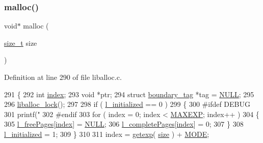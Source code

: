 \subsubsection{\texorpdfstring{malloc()}{malloc()}}
{\footnotesize\ttfamily void$\ast$ malloc (\begin{DoxyParamCaption}\item[{\hyperlink{a00038_a7c94ea6f8948649f8d181ae55911eeaf_a7c94ea6f8948649f8d181ae55911eeaf}{size\+\_\+t}}]{size }\end{DoxyParamCaption})}



Definition at line 290 of file liballoc.\+c.


\begin{DoxyCode}
291 \{
292     \textcolor{keywordtype}{int} \hyperlink{a00126_adfc426eed5361508d62c6e8f484bd270_adfc426eed5361508d62c6e8f484bd270}{index};
293     \textcolor{keywordtype}{void} *ptr;
294     \textcolor{keyword}{struct }\hyperlink{a00126}{boundary\_tag} *tag = \hyperlink{a00038_a070d2ce7b6bb7e5c05602aa8c308d0c4_a070d2ce7b6bb7e5c05602aa8c308d0c4}{NULL};
295 
296     \hyperlink{a00038_a8b5670e4594b0b6f8be78fe17f0c3b53_a8b5670e4594b0b6f8be78fe17f0c3b53}{liballoc\_lock}();
297 
298         \textcolor{keywordflow}{if} ( \hyperlink{a00035_a4aac6ed0ba0144598c5abe18222c3493_a4aac6ed0ba0144598c5abe18222c3493}{l\_initialized} == 0 )
299         \{
300 \textcolor{preprocessor}{            #ifdef DEBUG}
301             printf(\textcolor{stringliteral}{"%
302 \textcolor{preprocessor}{            #endif}
303             \textcolor{keywordflow}{for} ( index = 0; index < \hyperlink{a00035_af823bb7d083fafbd662be7ea09582013_af823bb7d083fafbd662be7ea09582013}{MAXEXP}; index++ )
304             \{
305                 \hyperlink{a00035_a78b8b6e448179d3cd64915f99fee60e0_a78b8b6e448179d3cd64915f99fee60e0}{l\_freePages}[\hyperlink{a00126_adfc426eed5361508d62c6e8f484bd270_adfc426eed5361508d62c6e8f484bd270}{index}] = \hyperlink{a00038_a070d2ce7b6bb7e5c05602aa8c308d0c4_a070d2ce7b6bb7e5c05602aa8c308d0c4}{NULL};
306                 \hyperlink{a00035_a213db3baf1d4b13d604015489247980d_a213db3baf1d4b13d604015489247980d}{l\_completePages}[\hyperlink{a00126_adfc426eed5361508d62c6e8f484bd270_adfc426eed5361508d62c6e8f484bd270}{index}] = 0;
307             \}
308             \hyperlink{a00035_a4aac6ed0ba0144598c5abe18222c3493_a4aac6ed0ba0144598c5abe18222c3493}{l\_initialized} = 1;
309         \}
310 
311         index = \hyperlink{a00035_ab5fc0b977bf14bdb99c8b87cae451d42_ab5fc0b977bf14bdb99c8b87cae451d42}{getexp}( \hyperlink{a00126_a29b056a39f6022d32468e7913e6df936_a29b056a39f6022d32468e7913e6df936}{size} ) + \hyperlink{a00035_ab8c52c1b4c021ed3e6b6b677bd2ac019_ab8c52c1b4c021ed3e6b6b677bd2ac019}{MODE};
}
\end{DoxyCode}
